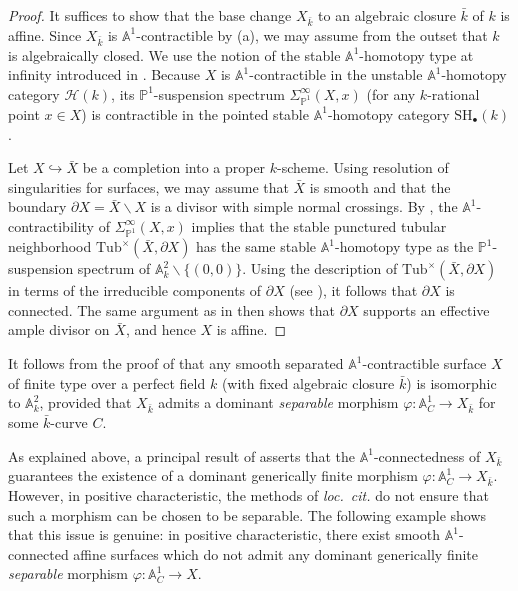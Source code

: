 \documentclass[10pt]{amsart}
\renewcommand{\AA}{\mathbb{A}}
\renewcommand{\setminus}{\smallsetminus}
\numberwithin{equation}{section} %
\theoremstyle{plain}
\theoremstyle{definition}
\theoremstyle{remark}
\begin{document}
\begin{proof}
It suffices to show that the base change $X_{\bar{k}}$ to an algebraic closure $\bar{k}$ of $k$ is affine. Since $X_{\bar{k}}$ is $\AA^1$-contractible by (a), we may assume from the outset that $k$ is algebraically closed. We use the notion of the stable $\AA^1$-homotopy type at infinity introduced in \cite{DDO}. Because $X$ is $\AA^1$-contractible in the unstable $\AA^1$-homotopy category $\mathcal{H}(k)$, its $\mathbb{P}^1$-suspension spectrum $\Sigma_{\mathbb{P}^1}^\infty(X,x)$ (for any $k$-rational point $x\in X$) is contractible in the pointed stable $\AA^1$-homotopy category $\mathrm{SH}_\bullet(k)$.
\smallskip

Let $X\hookrightarrow \bar{X}$ be a completion into a proper $k$-scheme. Using resolution of singularities for surfaces, we may assume that $\bar{X}$ is smooth and that the boundary $\partial X=\bar{X}\setminus X$ is a divisor with simple normal crossings. By \cite[Example~4.3.8]{DDO}, the $\AA^1$-contractibility of $\Sigma_{\mathbb{P}^1}^\infty(X,x)$ implies that the stable punctured tubular neighborhood $\mathrm{Tub}^{\times}(\bar{X},\partial X)$ has the same stable $\AA^1$-homotopy type as the $\mathbb{P}^1$-suspension spectrum of $\AA^2_k\setminus\{(0,0)\}$. Using the description of $\mathrm{Tub}^{\times}(\bar{X},\partial X)$ in terms of the irreducible components of $\partial X$ (see \cite[Section~4.2]{DDO}), it follows that $\partial X$ is connected. The same argument as in \cite[p.~512, Theorem, item~3]{fujita1982} then shows that $\partial X$ supports an effective ample divisor on $\bar{X}$, and hence $X$ is affine.
\end{proof}

It follows from the proof of  that any smooth separated $\AA^1$-contractible surface $X$ of finite type over a perfect field $k$ (with fixed algebraic closure $\bar{k}$) is isomorphic to $\AA^2_k$, provided that $X_{\bar{k}}$ admits a dominant \emph{separable} morphism $\varphi:\AA^1_C\to X_{\bar{k}}$ for some $\bar{k}$-curve $C$. 
\smallskip

As explained above, a principal result of \cite{choudhury2024,ChRoy26} asserts that the $\AA^1$-connectedness of $X_{\bar{k}}$ guarantees the existence of a dominant generically finite morphism $\varphi:\AA^1_C\to X_{\bar{k}}$. However, in positive characteristic, the methods of {\it loc.\ cit.} do not ensure that such a morphism can be chosen to be separable. The following example shows that this issue is genuine: in positive characteristic, there exist smooth $\AA^1$-connected affine surfaces which do not admit any dominant generically finite \emph{separable} morphism $\varphi:\AA^1_C\to X$.
\end{document}
